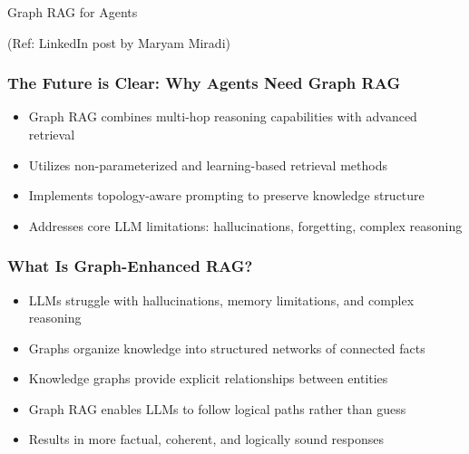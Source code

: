 \begin{frame}[fragile]\frametitle{}
\begin{center}
{\Large Graph RAG for Agents}

{\tiny (Ref: LinkedIn post by Maryam Miradi)}

\end{center}
\end{frame}


\begin{frame}[fragile]\frametitle{The Future is Clear: Why Agents Need Graph RAG}
      \begin{itemize}
        \item Graph RAG combines multi-hop reasoning capabilities with advanced retrieval
        \item Utilizes non-parameterized and learning-based retrieval methods
        \item Implements topology-aware prompting to preserve knowledge structure
        \item Addresses core LLM limitations: hallucinations, forgetting, complex reasoning
      \end{itemize}
\end{frame}

\begin{frame}[fragile]\frametitle{What Is Graph-Enhanced RAG?}
      \begin{itemize}
        \item LLMs struggle with hallucinations, memory limitations, and complex reasoning
        \item Graphs organize knowledge into structured networks of connected facts
        \item Knowledge graphs provide explicit relationships between entities
        \item Graph RAG enables LLMs to follow logical paths rather than guess
        \item Results in more factual, coherent, and logically sound responses
      \end{itemize}
\end{frame}

